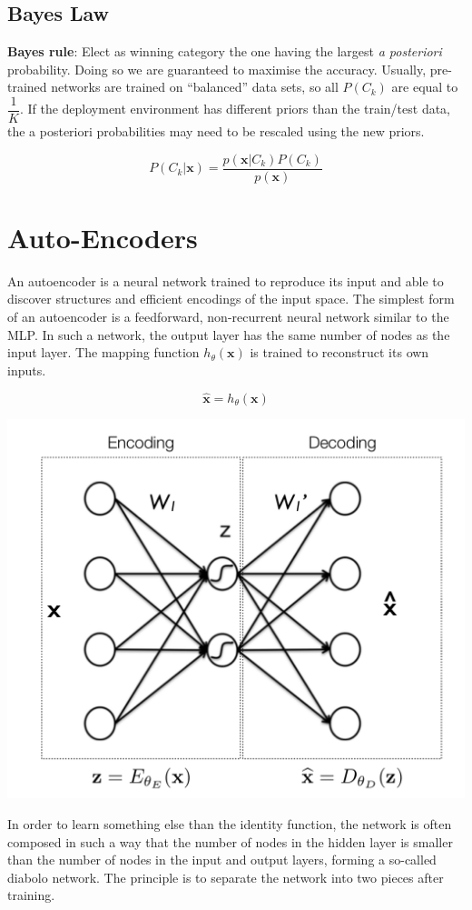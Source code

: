 \documentclass[11pt]{article}
\begin{document}
\subsection{Bayes Law}
\textbf{Bayes rule}: Elect as winning category the one having the largest \emph{a posteriori} probability. Doing so we are guaranteed to maximise the accuracy. Usually, pre-trained networks are trained on “balanced” data sets, so all $P(C_k)$ are equal to $\dfrac{1}{K}$. If the deployment environment has different priors than the train/test data, the a posteriori probabilities may need to be rescaled using the new priors.

\begin{equation*}
	P(C_k | \textbf{x}) = \frac{p(\textbf{x}|C_k)P(C_k)}{p(\textbf{x})}
\end{equation*}

\section{Auto-Encoders}
An autoencoder is a neural network trained to reproduce its input and able to discover structures and efficient encodings of the input space. The simplest form of an autoencoder is a feedforward,
non-recurrent neural network similar to the MLP. In such a network, the output layer has the same number of nodes as the input layer. The mapping function $h_\theta(\textbf{x})$ is trained to reconstruct its own inputs.

\begin{equation*}
	\widehat{\textbf{x}} = h_\theta(\textbf{x})
\end{equation*}

\begin{center}
	\includegraphics[width=0.5\linewidth]{img/autoencoder_diabolo}
\end{center}

In order to learn something else than the identity function, the network is often composed in such a way that the number of nodes in the hidden layer is smaller than the number of nodes in the input and output layers, forming a so-called diabolo network. The principle is to separate the network into two pieces after training.
\end{document}
